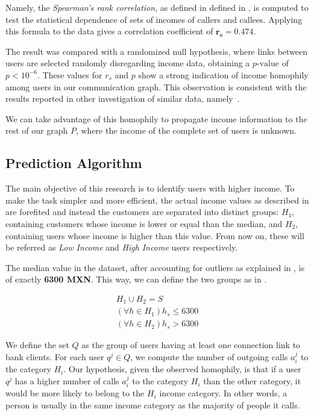 Namely, the \textit{Spearman's rank correlation}, as defined in defined in , is computed to test the statistical dependence of sets of incomes of callers and callees. Applying this formula to the data gives a correlation coefficient of $\mathbf{r_s = 0.474}$.

The result was compared with a randomized null hypothesis, where links between users are selected randomly disregarding income data, obtaining a $p\text{-value}$ of $p < 10^{-6}$. These values for $r_s$ and $p$ show a strong indication of income homophily among users in our communication graph. This observation is consistent with the results reported in other investigation of similar data, namely~\cite{leo2015socioeconomic}.

We can take advantage of this homophily to propagate income information to the rest of our graph $P$, where the income of the complete set of users is unknown.

\subsection{Prediction Algorithm}

The main objective of this research is to identify users with higher income. To make the task simpler and more efficient, the actual income values as described in  are forefited and instead the customers are separated into distinct groups: $H_1$, containing customers whose income is lower or equal than the median, and $H_2$, containing users whose income is higher than this value. From now on, these will be referred as \emph{Low Income} and \emph{High Income} users respectively.

The median value in the dataset, after accounting for outliers as explained in , is of exactly \textbf{6300 MXN}. This way, we can define the two groups as in .

\begin{equation}
\label{eq:h}
\begin{gathered}
H_1 \cup H_2 = S \\
\left( \forall h \in H_1 \right) h_s \leq 6300 \\
\left( \forall h \in H_2 \right) h_s > 6300
\end{gathered}
\end{equation}

We define the set \( Q \) as the group of users having at least one connection link to bank clients. For each user \( q^j \in Q \), we compute the number of outgoing calls \( a^j_i \) to the category \( H_i \). Our hypothesis, given the observed homophily, is that if a user \( q^j \) has a higher number of calls \( a^j_i \) to the category \( H_i \) than the other category, it would be more likely to belong to the \( H_i \) income category. In other words, a person is usually in the same income category as the majority of people it calls.


